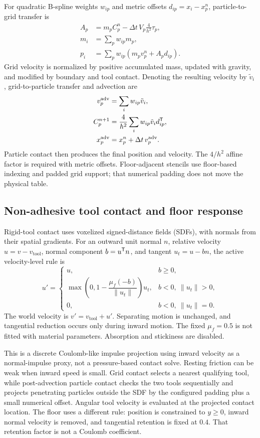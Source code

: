 For quadratic B-spline weights $w_{ip}$ and metric offsets $d_{ip}=x_i-x_p^n$, particle-to-grid transfer is
\begin{align}
 A_p&=m_pC_p^n-\Delta t\,V_p\frac{4}{h^2}\tau_p,\\
 m_i&=\sum_p w_{ip}m_p,\\
 p_i&=\sum_p w_{ip}\left(m_pv_p^n+A_pd_{ip}\right).
 \label{eq:p2g}
\end{align}
Grid velocity is normalized by positive accumulated mass, updated with gravity, and modified by boundary and tool contact. Denoting the resulting velocity by $\tilde v_i$, grid-to-particle transfer and advection are
\begin{align}
 v_p^{\mathrm{adv}}&=\sum_i w_{ip}\tilde v_i,\\
 C_p^{n+1}&=\frac{4}{h^2}\sum_i w_{ip}\tilde v_i d_{ip}^{\mathsf{T}},\\
 x_p^{\mathrm{adv}}&=x_p^n+\Delta t\,v_p^{\mathrm{adv}}.
 \label{eq:g2p}
\end{align}
Particle contact then produces the final position and velocity. The $4/h^2$ affine factor is required with metric offsets. Floor-adjacent stencils use floor-based indexing and padded grid support; that numerical padding does not move the physical table.

\subsection{Non-adhesive tool contact and floor response}

Rigid-tool contact uses voxelized signed-distance fields (SDFs), with normals from their spatial gradients. For an outward unit normal $n$, relative velocity $u=v-v_{\mathrm{tool}}$, normal component $b=u^{\mathsf{T}} n$, and tangent $u_t=u-bn$, the active velocity-level rule is
\begin{equation}
 u'=\begin{cases}
 u, & b\geq0,\\
 \max\!\left(0,1-\dfrac{\mu_f(-b)}{\|u_t\|}\right)u_t,
   & b<0,\ \|u_t\|>0,\\
 0, & b<0,\ \|u_t\|=0.
 \end{cases}
 \label{eq:contact}
\end{equation}
The world velocity is $v'=v_{\mathrm{tool}}+u'$. Separating motion is unchanged, and tangential reduction occurs only during inward motion. The fixed $\mu_f=0.5$ is not fitted with material parameters. Absorption and stickiness are disabled.

This is a discrete Coulomb-like impulse projection using inward velocity as a normal-impulse proxy, not a pressure-based contact solve. Resting friction can be weak when inward speed is small. Grid contact selects a nearest qualifying tool, while post-advection particle contact checks the two tools sequentially and projects penetrating particles outside the SDF by the configured padding plus a small numerical offset. Angular tool velocity is evaluated at the projected contact location. The floor uses a different rule: position is constrained to $y\geq0$, inward normal velocity is removed, and tangential retention is fixed at $0.4$. That retention factor is not a Coulomb coefficient.

